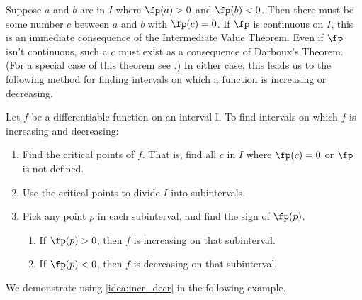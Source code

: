 Suppose $a$ and $b$ are in $I$ where $\fp(a)>0$ and $\fp(b)<0$. Then there must be some number $c$ between $a$ and $b$ with $\fp(c)=0$. If $\fp$ is continuous on $I$, this is an immediate consequence of the Intermediate Value Theorem.  Even if $\fp$ isn't continuous, such a $c$ must exist as a consequence of Darboux's Theorem.  (For a special case of this theorem see .)  In either case, this leads us to the following method for finding intervals on which a function is increasing or decreasing.

{Let $f$ be a differentiable function on an interval I. To find intervals on which $f$ is increasing and decreasing:
\begin{enumerate}
\item	Find the critical points of $f$. That is, find all $c$ in $I$ where $\fp(c) = 0$ or $\fp$ is not defined.
\item	Use the critical points to divide $I$ into subintervals.
\item	Pick any point $p$ in each subinterval, and find the sign of $\fp(p)$. 
		\begin{enumerate}
		\item	If $\fp(p)>0$, then $f$ is increasing on that subinterval.
		\item	If $\fp(p)<0$, then $f$ is decreasing on that subinterval.
		\end{enumerate}
\end{enumerate}}


We demonstrate using \autoref{idea:incr_decr} in the following example.

